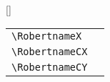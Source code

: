 [\maleline]
\fbox{\usebox{\Robert}}\hfill
%
\makeatletter
\let\nameuse=\@nameuse
\makeatother
\newcommand{\boxsz}[1]{%
  \texttt{\textbackslash#1} & \nameuse{#1}\\%
}
\newcommand{\tblA}{%
  \begin{tabular}{l|l}%
    \boxsz{RobertnameX}%
    \boxsz{RobertnameCX}%
    \boxsz{RobertnameCY}%
  \end{tabular}%
}
\par
\bigskip
\hfill\tblA
